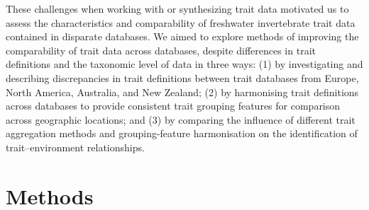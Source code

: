 \documentclass{article}
\begin{document}
These challenges when working with or synthesizing trait data motivated us to assess the characteristics and comparability of freshwater invertebrate trait data contained in disparate databases. We aimed to explore methods of improving the comparability of trait data across databases, despite differences in trait definitions and the taxonomic level of data in three ways: (1) by investigating and describing discrepancies in trait definitions between trait databases from Europe, North America, Australia, and New Zealand; (2) by harmonising trait definitions across databases to provide consistent trait grouping features for comparison across geographic locations; and (3) by comparing the influence of different trait aggregation methods and grouping-feature harmonisation on the identification of trait–environment relationships.



\newpage

\section*{Methods}

\end{document}
